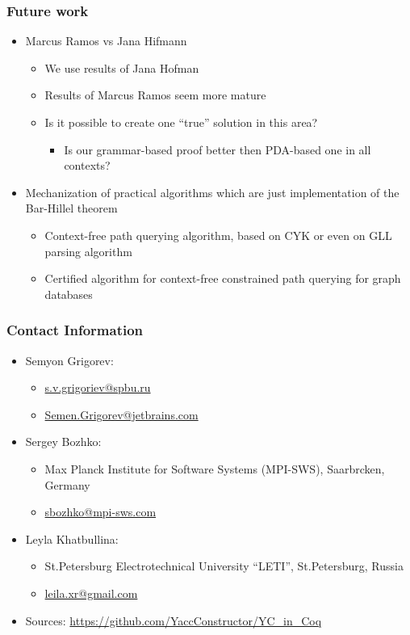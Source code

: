 \documentclass[xcolor=table]{beamer}
\begin{document}
\begin{frame} \frametitle{Future work}

\begin{itemize}
 \item Marcus Ramos vs Jana Hifmann
 \begin{itemize}
   \item We use results of Jana Hofman
   \item Results of Marcus Ramos seem more mature
   \item Is it possible to create one ``true'' solution in this area?
   \begin{itemize}
     \item Is our grammar-based proof better then PDA-based one in all contexts?
   \end{itemize}
 \end{itemize}
 \pause
 \item Mechanization of practical algorithms which are just implementation of the Bar-Hillel theorem
 \begin{itemize}
   \item Context-free path querying algorithm, based on CYK or even on GLL parsing algorithm
   \item Certified algorithm for context-free constrained path querying for graph databases
 \end{itemize}
\end{itemize}

\end{frame}



\begin{frame}
\frametitle{Contact Information}
\begin{itemize}
  \item Semyon Grigorev:
    \begin{itemize}
      \item \href{mailto:s.v.grigoriev@spbu.ru}{s.v.grigoriev@spbu.ru}
      \item \href{mailto:Semen.Grigorev@jetbrains.com}{Semen.Grigorev@jetbrains.com}
    \end{itemize}
  \item Sergey Bozhko:
  \begin{itemize}
    \item  Max Planck Institute for Software Systems (MPI-SWS), Saarbrcken, Germany
    \item  \href{mailto:sbozhko@mpi-sws.com}{sbozhko@mpi-sws.com}
  \end{itemize}
    \item Leyla Khatbullina:
  \begin{itemize}
    \item St.Petersburg Electrotechnical University ``LETI'', St.Petersburg, Russia
    \item  \href{mailto:leila.xr@gmail.com}{leila.xr@gmail.com}
  \end{itemize}
  \item Sources: \href{https://github.com/YaccConstructor/YC_in_Coq}{https://github.com/YaccConstructor/YC\_in\_Coq}
\end{itemize}
\vspace{0.5cm}
\end{frame}
\end{document}

